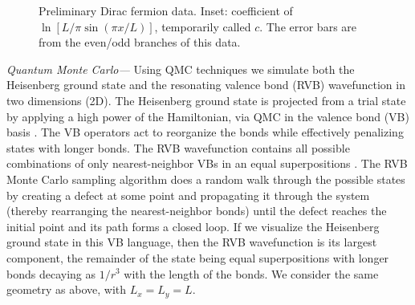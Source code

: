\documentclass[prl,aps,twocolumn,floatfix,amsmath,amssymb,superscriptaddress,tightenlines]{revtex4}
\begin{document}
 \begin{figure}[ht]
   \begin{center}
   \end{center}
   \caption{Preliminary Dirac fermion data. Inset: coefficient of $\ln\left[ L/\pi \sin( \pi x/L ) \right]$, temporarily called $c$. The error bars are from the even/odd branches of this data.}
   \label{fig:dirac}
 \end{figure}
 
{\it Quantum Monte Carlo---}
Using QMC techniques we simulate both the
Heisenberg ground state and the resonating valence bond (RVB)
wavefunction in two dimensions (2D).  The Heisenberg ground state is
projected from a trial state by applying a high power of the
Hamiltonian, via QMC in the valence bond (VB)
basis \cite{Sandvik}. The VB operators act to reorganize the
bonds while effectively penalizing states with longer bonds.  The RVB
wavefunction contains all possible combinations of only
nearest-neighbor VBs in an equal superpositions \cite{RVB1,RVB2}.  The RVB 
Monte Carlo sampling
algorithm does a random walk through the possible states by creating a
defect at some point and propagating it through the system (thereby
rearranging the nearest-neighbor bonds) until the defect reaches the
initial point and its path forms a closed loop.
If we visualize the Heisenberg ground state in this VB language, then the RVB wavefunction is its largest component, the remainder of the state being equal superpositions with longer bonds decaying as $1/r^3$ \cite{Sandvik} with the length of the bonds.
We consider the same geometry as above, with $L_x=L_y=L$.
\end{document}
